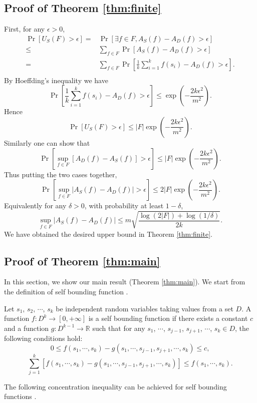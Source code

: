 \subsection{Proof of Theorem \ref{thm:finite}}
First, for any $\epsilon > 0$,
$$\begin{aligned}
\Pr[U_S(F) > \epsilon] =& \Pr[\exists f\in F, A_S(f) - A_D(f) > \epsilon] \\
\leq & \sum_{f\in F} \Pr[A_S(f) - A_D(f) > \epsilon] \\
=& \sum_{f\in F} \Pr[\frac{1}{k} \sum_{i=1}^k f(s_i) - A_D(f) > \epsilon]. \\
\end{aligned}$$ 
By Hoeffding's inequality \cite{BBL04} we have
$$\Pr[\frac{1}{k} \sum_{i=1}^k f(s_i) - A_D(f) > \epsilon] \leq \exp\left(-\frac{2k\epsilon^2}{m^2}\right).$$
Hence
$$\Pr[U_S(F) > \epsilon] \leq |F| \exp\left(-\frac{2k\epsilon^2}{m^2}\right).$$
Similarly one can show that
$$\Pr[\sup_{f\in F} [ A_D(f) - A_S(f) ] > \epsilon] \leq |F| \exp\left(-\frac{2k\epsilon^2}{m^2}\right).$$
Thus putting the two cases together,
$$\Pr[\sup_{f\in F} | A_S(f) - A_D(f) | > \epsilon] \leq 2|F| \exp\left(-\frac{2k\epsilon^2}{m^2}\right).$$
Equivalently for any $\delta>0$, with probability at least $1-\delta$,
$$\sup_{f\in F} | A_S(f) - A_D(f) | \leq m\sqrt{\frac{\log(2|F|) + \log(1/\delta)}{2k}}.$$
We have obtained the desired upper bound in Theorem \ref{thm:finite}.

\subsection{Proof of Theorem \ref{thm:main}}
In this section, we show our main result (Theorem \ref{thm:main}).
We start from the definition of self bounding function \cite{Oneto13}.
\begin{definition}
Let $s_1$, $s_2$, $\cdots$, $s_k$ be independent random variables taking values from a set $D$. A function $f: D^k \to [0, +\infty]$ is a self bounding function if there exists a constant $c$ and a function $g: D^{k-1}\to \mathbb{R}$ such that for any $s_1$, $\cdots$, $s_{j-1}$, $s_{j+1}$, $\cdots$, $s_k \in D$, the following conditions hold:
$$0 \leq f(s_1, \cdots, s_k) - g(s_1,\cdots, s_{j-1}, s_{j+1}, \cdots, s_k) \leq c,$$
$$\sum_{j=1}^k [f(s_1, \cdots, s_k) - g(s_1,\cdots, s_{j-1}, s_{j+1}, \cdots, s_k)] \leq f(s_1, \cdots, s_k).$$
\end{definition}

The following concentration inequality can be achieved for self bounding functions \cite{BLM99}.

